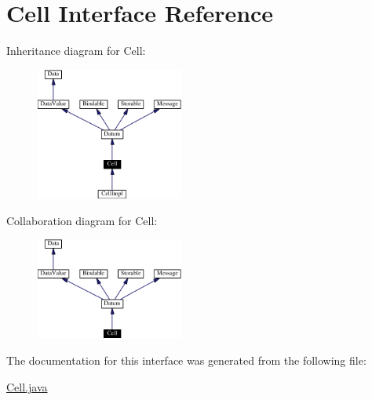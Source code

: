 \hypertarget{interfaceCell}{
\section{Cell  Interface Reference}
\label{interfaceCell}
}
Inheritance diagram for Cell:\begin{figure}[H]
\begin{center}
\leavevmode
\includegraphics[width=137pt]{interfaceCell__inherit__graph}
\end{center}
\end{figure}
Collaboration diagram for Cell:\begin{figure}[H]
\begin{center}
\leavevmode
\includegraphics[width=137pt]{interfaceCell__coll__graph}
\end{center}
\end{figure}


The documentation for this interface was generated from the following file:\begin{CompactItemize}
\item 
\hyperlink{Cell_8java-source}{Cell.java}\end{CompactItemize}
